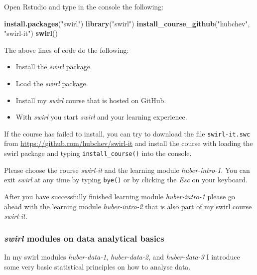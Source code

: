 \documentclass[
  12pt,
  oneside]{book}
\newenvironment{Shaded}{\begin{snugshade}}{\end{snugshade}}
\newcommand{\FunctionTok}[1]{\textcolor[rgb]{0.13,0.29,0.53}{\textbf{#1}}}
\newcommand{\NormalTok}[1]{#1}
\newcommand{\StringTok}[1]{\textcolor[rgb]{0.31,0.60,0.02}{#1}}
\providecommand{\tightlist}{%
  \setlength{\itemsep}{0pt}\setlength{\parskip}{0pt}}
\theoremstyle{definition}
\theoremstyle{definition}
\theoremstyle{definition}
\theoremstyle{definition}
\theoremstyle{remark}
\begin{document}
Open Rstudio and type in the console the following:

\begin{Shaded}
\begin{Highlighting}[]
\FunctionTok{install.packages}\NormalTok{(}\StringTok{"swirl"}\NormalTok{)}
\FunctionTok{library}\NormalTok{(}\StringTok{"swirl"}\NormalTok{)}
\FunctionTok{install\_course\_github}\NormalTok{(}\StringTok{"hubchev"}\NormalTok{, }\StringTok{"swirl{-}it"}\NormalTok{)}
\FunctionTok{swirl}\NormalTok{()}
\end{Highlighting}
\end{Shaded}

The above lines of code do the following:

\begin{itemize}
\tightlist
\item
  Install the \emph{swirl} package.
\item
  Load the \emph{swirl} package.
\item
  Install my \emph{swirl} course that is hosted on GitHub.
\item
  With \emph{swirl} you start \emph{swirl} and your learning experience.
\end{itemize}

If the course has failed to install, you can try to download the file \texttt{swirl-it.swc} from \url{https://github.com/hubchev/swirl-it} and install the course with loading the swirl package and typing \texttt{install\_course()} into the console.

Please choose the course \emph{swirl-it} and the learning module \emph{huber-intro-1}.
You can exit \emph{swirl} at any time by typing \texttt{bye()} or by clicking the \emph{Esc} on your keyboard.

After you have successfully finished learning module \emph{huber-intro-1} please go ahead with the learning module \emph{huber-intro-2} that is also part of my swirl course \emph{swirl-it}.

\hypertarget{swirl-modules-on-data-analytical-basics}{%
\subsubsection*{\texorpdfstring{\emph{swirl} modules on data analytical basics}{swirl modules on data analytical basics}}\label{swirl-modules-on-data-analytical-basics}}

In my swirl modules \emph{huber-data-1}, \emph{huber-data-2}, and \emph{huber-data-3} I introduce some very basic statistical principles on how to analyse data.
\end{document}
